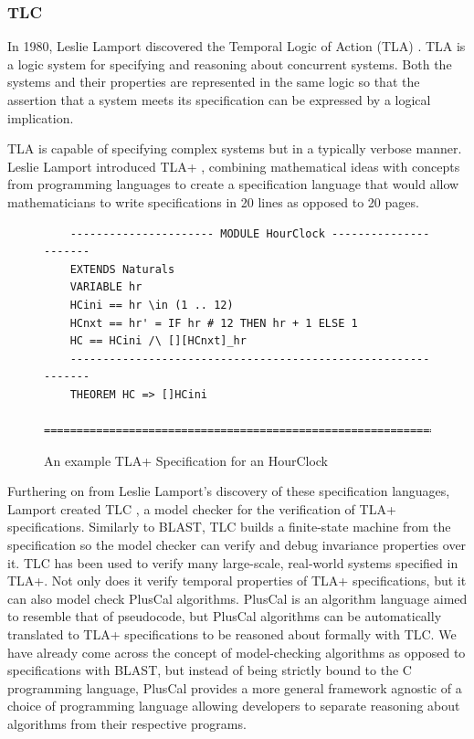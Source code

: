 \subsubsection*{\textbf{TLC}}
In 1980, Leslie Lamport discovered the Temporal Logic of Action (TLA) \cite{tla}. TLA is a logic system for specifying and reasoning about concurrent systems. Both the systems and their properties are represented in the same logic so that the assertion that a system meets its specification can be expressed by a logical implication.
\par
TLA is capable of specifying complex systems but in a typically verbose manner. Leslie Lamport introduced TLA+ \cite{tlaplus}, combining mathematical ideas with concepts from programming languages to create a specification language that would allow mathematicians to write specifications in 20 lines as opposed to 20 pages.
\begin{figure}[H]
    \begin{verbatim}
    ---------------------- MODULE HourClock ----------------------
    EXTENDS Naturals
    VARIABLE hr
    HCini == hr \in (1 .. 12)
    HCnxt == hr' = IF hr # 12 THEN hr + 1 ELSE 1
    HC == HCini /\ [][HCnxt]_hr
    --------------------------------------------------------------
    THEOREM HC => []HCini
    ==============================================================
    \end{verbatim}
    \caption{An example TLA+ Specification for an HourClock \cite{tlaplus}}
    \label{fig:hourclock_spec}
\end{figure}
\par
Furthering on from Leslie Lamport's discovery of these specification languages, Lamport created TLC \cite{tlc}, a model checker for the verification of TLA+ specifications. Similarly to BLAST, TLC builds a finite-state machine from the specification so the model checker can verify and debug invariance properties over it. TLC has been used to verify many large-scale, real-world systems specified in TLA+. Not only does it verify temporal properties of TLA+ specifications, but it can also model check PlusCal \cite{pluscal} algorithms. PlusCal is an algorithm language aimed to resemble that of pseudocode, but PlusCal algorithms can be automatically translated to TLA+ specifications to be reasoned about formally with TLC. We have already come across the concept of model-checking algorithms as opposed to specifications with BLAST, but instead of being strictly bound to the C programming language, PlusCal provides a more general framework agnostic of a choice of programming language allowing developers to separate reasoning about algorithms from their respective programs.

